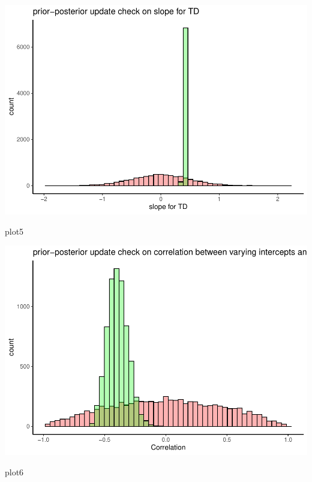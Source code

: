 \documentclass[
]{article}
\newenvironment{Shaded}{\begin{snugshade}}{\end{snugshade}}
\newcommand{\NormalTok}[1]{#1}
\begin{document}
\includegraphics{assignment_1_final_files/figure-latex/unnamed-chunk-14-4.pdf}

\begin{Shaded}
\begin{Highlighting}[]
\NormalTok{plot5}
\end{Highlighting}
\end{Shaded}

\includegraphics{assignment_1_final_files/figure-latex/unnamed-chunk-14-5.pdf}

\begin{Shaded}
\begin{Highlighting}[]
\NormalTok{plot6}
\end{Highlighting}
\end{Shaded}
\end{document}
